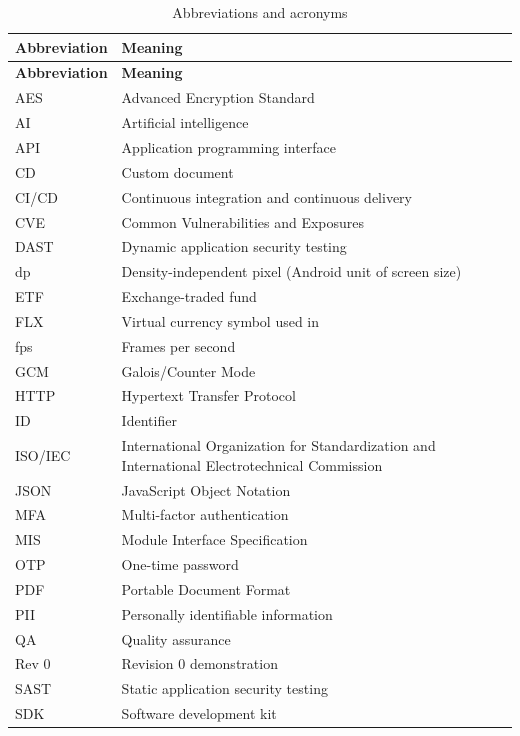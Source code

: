 \documentclass[12pt, titlepage]{article}
\begin{document}
{\small
\begin{xltabular}{\textwidth}{|p{2.8cm}|X|}
\caption{Abbreviations and acronyms}\label{tab:acronyms}\\
\hline
\textbf{Abbreviation} & \textbf{Meaning} \\
\hline
\endfirsthead
\hline
\textbf{Abbreviation} & \textbf{Meaning} \\
\hline
\endhead
AES & Advanced Encryption Standard \\ \hline
AI & Artificial intelligence \\ \hline
API & Application programming interface \\ \hline
CD & Custom document \\ \hline
CI/CD & Continuous integration and continuous delivery \\ \hline
CVE & Common Vulnerabilities and Exposures \\ \hline
DAST & Dynamic application security testing \\ \hline
dp & Density-independent pixel (Android unit of screen size) \\ \hline
ETF & Exchange-traded fund \\ \hline
FLX & Virtual currency symbol used in \progname{} \\ \hline
fps & Frames per second \\ \hline
GCM & Galois/Counter Mode \\ \hline
HTTP & Hypertext Transfer Protocol \\ \hline
ID & Identifier \\ \hline
ISO/IEC & International Organization for Standardization and International Electrotechnical Commission \\ \hline
JSON & JavaScript Object Notation \\ \hline
MFA & Multi-factor authentication \\ \hline
MIS & Module Interface Specification \\ \hline
OTP & One-time password \\ \hline
PDF & Portable Document Format \\ \hline
PII & Personally identifiable information \\ \hline
QA & Quality assurance \\ \hline
Rev 0 & Revision 0 demonstration \\ \hline
SAST & Static application security testing \\ \hline
SDK & Software development kit \\ \hline

\end{xltabular}}
\end{document}
